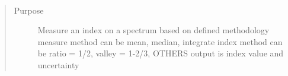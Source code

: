 \documentclass[letterpaper,10pt,english]{sphinxmanual}
\begin{document}

\begin{fulllineitems}
\label{api:splat.measureIndex}~\begin{quote}\begin{description}
\item[{Purpose}] \leavevmode
Measure an index on a spectrum based on defined methodology
measure method can be mean, median, integrate
index method can be ratio = 1/2, valley = 1-2/3, OTHERS
output is index value and uncertainty

\end{description}\end{quote}

\end{fulllineitems}

\end{document}
